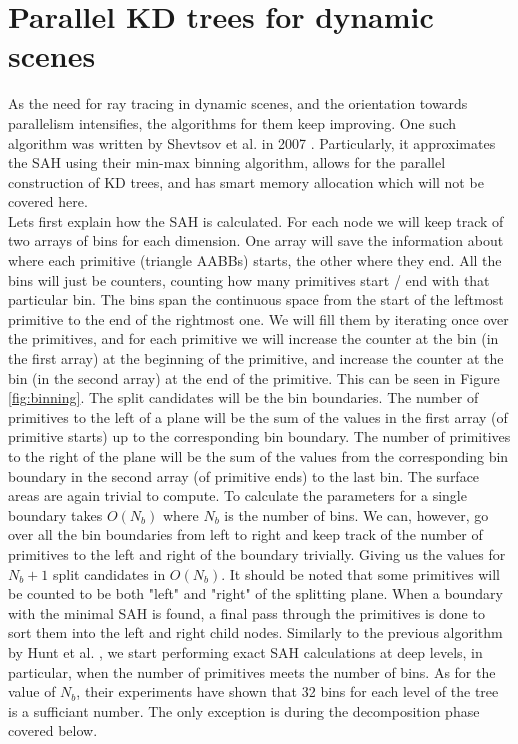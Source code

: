 \documentclass[12pt]{article}
\begin{document}
\section{Parallel KD trees for dynamic scenes}
As the need for ray tracing in dynamic scenes, and the orientation towards parallelism intensifies, the algorithms for them keep improving. One such algorithm was written by Shevtsov et al. in 2007 \cite{shevtsov2007highly}. Particularly, it approximates the SAH using their min-max binning algorithm, allows for the parallel construction of KD trees, and has smart memory allocation which will not be covered here.\\
\indent Lets first explain how the SAH is calculated. For each node we will keep track of two arrays of bins for each dimension. One array will save the information about where each primitive (triangle AABBs) starts, the other where they end. All the bins will just be counters, counting how many primitives start / end with that particular bin. The bins span the continuous space from the start of the leftmost primitive to the end of the rightmost one. We will fill them by iterating once over the primitives, and for each primitive we will increase the counter at the bin (in the first array) at the beginning of the primitive, and increase the counter at the bin (in the second array) at the end of the primitive. This can be seen in Figure \ref{fig:binning}. The split candidates will be the bin boundaries. The number of primitives to the left of a plane will be the sum of the values in the first array (of primitive starts) up to the corresponding bin boundary. The number of primitives to the right of the plane will be the sum of the values from the corresponding bin boundary in the second array (of primitive ends) to the last bin. The surface areas are again trivial to compute. To calculate the parameters for a single boundary takes $O(N_b)$ where $N_b$ is the number of bins. We can, however, go over all the bin boundaries from left to right and keep track of the number of primitives to the left and right of the boundary trivially. Giving us the values for $N_b + 1$ split candidates in $O(N_b)$. It should be noted that some primitives will be counted to be both "left" and "right" of the splitting plane. When a boundary with the minimal SAH is found, a final pass through the primitives is done to sort them into the left and right child nodes. Similarly to the previous algorithm by Hunt et al. \cite{hunt2006fast}, we start performing exact SAH calculations at deep levels, in particular, when the number of primitives meets the number of bins. As for the value of $N_b$, their experiments have shown that 32 bins for each level of the tree is a sufficiant number. The only exception is during the decomposition phase covered below.\\
\end{document}

